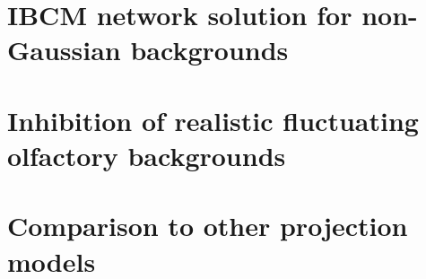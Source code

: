 \documentclass[letter, 12pt]{article}
\begin{document}
\section{IBCM network solution for non-Gaussian backgrounds}
\label{sect:ibcm_non-gaussian_examples}



\section{Inhibition of realistic fluctuating olfactory backgrounds}
\label{sect:realistic_odors}



\section{Comparison to other projection models}
\label{sect:other_models}



\printbibliography
\end{document}
